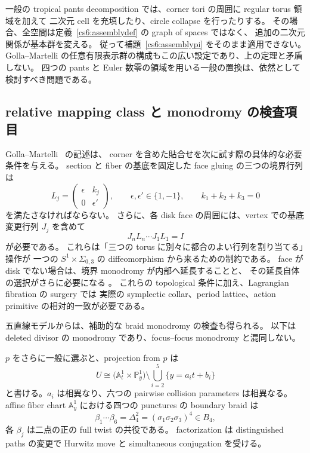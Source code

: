 \begin{remark}[この定理が除外しない操作]
\label{cs6:nogoscope}
一般の tropical pants decomposition では、corner tori の周囲に regular torus 領域を加えて
二次元 cell を充填したり、circle collapse を行ったりする。
その場合、全空間は定義~\ref{cs6:assemblydef} の graph of spaces ではなく、
追加の二次元関係が基本群を変える。
従って補題~\ref{cs6:assemblypi} をそのまま適用できない。
Golla--Martelli の任意有限表示群の構成もこの広い設定であり、上の定理と矛盾しない。
四つの pants と Euler 数零の領域を用いる一般の置換は、依然として検討すべき問題である。
\end{remark}

\subsection{relative mapping class と monodromy の検査項目}

Golla--Martelli~\cite[Proposition~4.3]{GollaMartelli} の記述は、
corner を含めた貼合せを次に試す際の具体的な必要条件を与える。
section と fiber の基底を固定した face gluing の三つの境界行列は
\[
 L_j=\begin{pmatrix}\epsilon&k_j\\0&\epsilon'\end{pmatrix},
 \qquad \epsilon,\epsilon'\in\{1,-1\},\qquad k_1+k_2+k_3=0
\]
を満たさなければならない。
さらに、各 disk face の周囲には、vertex での基底変更行列 $J_j$ を含めて
\[
 J_nL_n\cdots J_1L_1=I
\]
が必要である。
これらは「三つの torus に別々に都合のよい行列を割り当てる」操作が
一つの $S^1\times\Sigma_{0,3}$ の diffeomorphism から来るための制約である。
face が disk でない場合は、境界 monodromy が内部へ延長することと、
その延長自体の選択がさらに必要になる
\cite[Remark~4.9]{GollaMartelli}。
これらの topological 条件に加え、Lagrangian fibration の surgery では
実際の symplectic collar、period lattice、action primitive の相対的一致が必要である。

五直線モデルからは、補助的な braid monodromy の検査も得られる。
以下は deleted divisor の monodromy であり、focus--focus monodromy と混同しない。

\begin{proposition}
\label{cs6:braid}
$p$ をさらに一般に選ぶと、projection from $p$ は
\[
 U\cong\bigl(\mathbb A^1_t\times\mathbb P^1_y\bigr)
 \setminus\bigcup_{i=2}^5\{y=a_it+b_i\}
\]
と書ける。$a_i$ は相異なり、六つの pairwise collision parameters は相異なる。
affine fiber chart $\mathbb A^1_y$ における四つの punctures の boundary braid は
\[
 \beta_1\cdots\beta_6=\Delta_4^2=(\sigma_1\sigma_2\sigma_3)^4\in B_4,
\]
各 $\beta_j$ は二点の正の full twist の共役である。
factorization は distinguished paths の変更で Hurwitz move と simultaneous conjugation を受ける。
\end{proposition}

